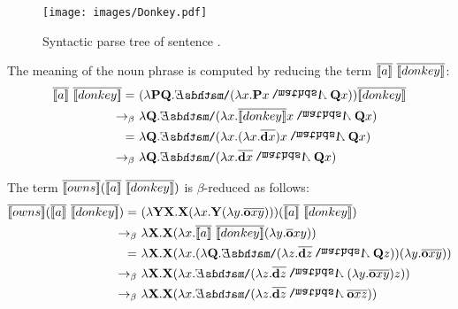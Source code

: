 \begin{figure}[h!]
 \centering
    \texttt{[image: images/Donkey.pdf]}
\caption{Syntactic parse tree of sentence .} \label{fig:donkey-copy}
\end{figure}

\begin{example}

The meaning of the noun phrase  is computed by reducing the term $\overline{[\![a]\!]} \ \overline{[\![donkey]\!]} $:
\begin{align*}
 \tr{\I{a}} \ \tr{\I{donkey}}   = \ & (\lambda \P2 \Q2. \ex2 (\lambda \x1.  \P2 \x1 \cnj2 \Q2 \x1 ) ) \tr{\I{donkey}}   \\
 \bconv \ &  \lambda  \Q2. \ex2 (\lambda \x1.  \tr{\I{donkey}} \x1  \cnj2  \Q2 \x1 ) \\
 = \ &  \lambda  \Q2. \ex2 (\lambda \x1. (\lambda \x1.\tr{\cdonkey \x1}) \x1  \cnj2  \Q2 \x1 ) \\
\bconv \ &  \lambda  \Q2. \ex2 (\lambda \x1.  \tr{\cdonkey \x1} \cnj2  \Q2 \x1 )
\end{align*}



The term $ \tr{\I{owns}}  (\tr{\I{a}} \ \tr{\I{donkey}}) $ is $\beta$-reduced as follows:
\begin{align*}
\tr{\I{owns}}  (\tr{\I{a}} \ \tr{\I{donkey}} ) = \ & ( \lambda \Y2 \X2. \X2 ( \lambda \x1. \Y2 (\lambda \y1.  \tr{\cown  \x1 \y1} )))  (\tr{\I{a}} \ \tr{\I{donkey}} ) \\
\bconv \ &   \lambda \X2. \X2 ( \lambda \x1. \tr{\I{a}} \ \tr{\I{donkey}} (\lambda \y1.  \tr{\cown}  \x1 \y1 ))   \\
= \ &  \lambda \X2. \X2 ( \lambda \x1. ( \lambda  \Q2. \ex2 (\lambda \z1.  \tr{\cdonkey \z1}\cnj2 \Q2 \z1 ) ) (\lambda \y1.  \tr{\cown  \x1 \y1} ))   \\
\bconv \ &  \lambda \X2. \X2 ( \lambda \x1. \ex2 (\lambda \z1.  \tr{\cdonkey \z1}\cnj2  (\lambda \y1.  \tr{\cown  \x1 \y1 }) \z1   ))   \\
\bconv \ & \lambda \X2. \X2 ( \lambda \x1.  \ex2 (\lambda \z1. \tr{\cdonkey \z1}\cnj2  \tr{\cown  \x1 \z1 }))  
\end{align*}


\end{example}
